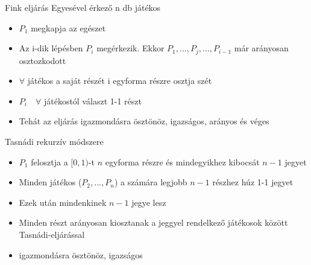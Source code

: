 	\begin{definition}{Fink eljárás}{}
		Egyesével érkező n db játékos
		\begin{itemize}
			\item $P_1$ megkapja az egészet
			\item Az i-dik lépésben $P_i$ megérkezik. Ekkor $P_1, ..., P_j,..., P_{i-1}$ már arányosan osztozkodott 
			\item $\forall$ játékos a saját részét i egyforma részre osztja szét
			\item $P_i \quad \forall$ játékostól választ 1-1 részt 
			\item Tehát az eljárás igazmondásra ösztönöz, igazságos, arányos és véges
		\end{itemize}
	\end{definition}

	
	\begin{definition}{Tasnádi rekurzív módszere}{}
		\begin{itemize}
			\item $P_1$ felosztja a $[0,1)$-t $n$ egyforma részre és mindegyikhez kibocsát $n-1$ jegyet
			\item Minden játékos ($P_2, ..., P_n$) a számára legjobb $n-1$ részhez húz 1-1 jegyet
			\item Ezek után mindenkinek $n-1$ jegye lesz
			\item Minden részt arányosan kiosztanak a jeggyel rendelkező játékosok között Tasnádi-eljárással
			\item igazmondásra ösztönöz, igazságos
		\end{itemize}
	\end{definition}
	
